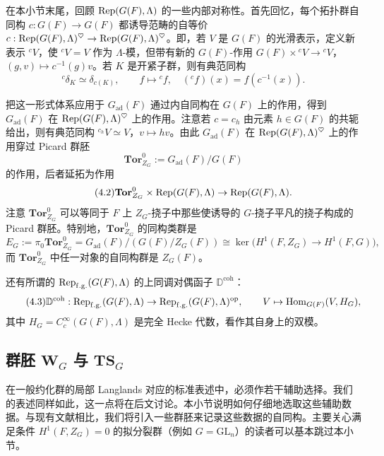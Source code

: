 在本小节末尾，回顾 $\operatorname{Rep}(G(F),\Lambda)$ 的一些内部对称性。首先回忆，每个拓扑群自同构 $c:G(F)\to G(F)$ 都诱导范畴的自等价 $c:\operatorname{Rep}(G(F),\Lambda)^{\heartsuit}\to\operatorname{Rep}(G(F),\Lambda)^{\heartsuit}$。即，若 $V$ 是 $G(F)$ 的光滑表示，定义新表示 ${}^cV$，使 ${}^cV=V$ 作为 $\Lambda$-模，但带有新的 $G(F)$-作用 $G(F)\times{}^cV\to{}^cV$，$(g,v)\mapsto c^{-1}(g)v$。若 $K$ 是开紧子群，则有典范同构
\[
{}^c\delta_K\simeq\delta_{c(K)},\qquad f\mapsto{}^cf,\quad ({}^cf)(x)=f(c^{-1}(x)).
\]

把这一形式体系应用于 $G_{\mathrm{ad}}(F)$ 通过内自同构在 $G(F)$ 上的作用，得到 $G_{\mathrm{ad}}(F)$ 在 $\operatorname{Rep}(G(F),\Lambda)^{\heartsuit}$ 上的作用。注意若 $c=c_h$ 由元素 $h\in G(F)$ 的共轭给出，则有典范同构 ${}^{c_h}V\simeq V$，$v\mapsto hv$。由此 $G_{\mathrm{ad}}(F)$ 在 $\operatorname{Rep}(G(F),\Lambda)^{\heartsuit}$ 上的作用穿过 Picard 群胚
\[
\mathbf{Tor}^0_{Z_G}:=G_{\mathrm{ad}}(F)/G(F)
\]
的作用，后者延拓为作用
\begin{equation}
\tag{4.2}
\mathbf{Tor}^0_{Z_G}\times\operatorname{Rep}(G(F),\Lambda)\to\operatorname{Rep}(G(F),\Lambda).
\end{equation}
注意 $\mathbf{Tor}^0_{Z_G}$ 可以等同于 $F$ 上 $Z_G$-挠子中那些使诱导的 $G$-挠子平凡的挠子构成的 Picard 群胚。特别地，$\mathbf{Tor}^0_{Z_G}$ 的同构类群是
\[
E_G:=\pi_0\mathbf{Tor}^0_{Z_G}=G_{\mathrm{ad}}(F)/(G(F)/Z_G(F))\cong\ker\big(H^1(F,Z_G)\to H^1(F,G)\big),
\]
而 $\mathbf{Tor}^0_{Z_G}$ 中任一对象的自同构群是 $Z_G(F)$。

还有所谓的 $\operatorname{Rep}_{\mathrm{f.g.}}(G(F),\Lambda)$ 的上同调对偶函子 $\mathbb{D}^{\mathrm{coh}}$：
\begin{equation}
\tag{4.3}
\mathbb{D}^{\mathrm{coh}}:\operatorname{Rep}_{\mathrm{f.g.}}(G(F),\Lambda)\to\operatorname{Rep}_{\mathrm{f.g.}}(G(F),\Lambda)^{\mathrm{op}},\qquad
V\mapsto\operatorname{Hom}_{G(F)}(V,H_G),
\end{equation}
其中 $H_G=C_c^\infty(G(F),\Lambda)$ 是完全 Hecke 代数，看作其自身上的双模。

\subsection{群胚 $\mathbf{W}_G$ 与 $\mathbf{TS}_G$}
在一般约化群的局部 Langlands 对应的标准表述中，必须作若干辅助选择。我们的表述同样如此，这一点将在后文讨论。本小节说明如何仔细地选取这些辅助数据。与现有文献相比，我们将引入一些群胚来记录这些数据的自同构。主要关心满足条件 $H^1(F,Z_G)=0$ 的拟分裂群（例如 $G=\mathrm{GL}_n$）的读者可以基本跳过本小节。

